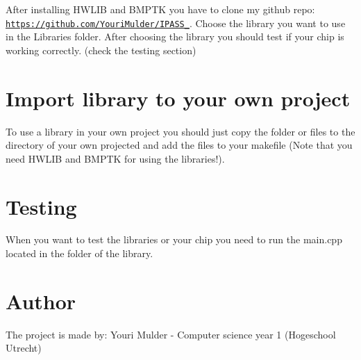After installing H\+W\+L\+IB and B\+M\+P\+TK you have to clone my github repo\+: \href{https://github.com/YouriMulder/IPASS_2018}{\tt https\+://github.\+com/\+Youri\+Mulder/\+I\+P\+A\+S\+S\+\_}. Choose the library you want to use in the Libraries folder. After choosing the library you should test if your chip is working correctly. (check the testing section)\hypertarget{index_import_sec}{}\section{Import library to your own project}\label{index_import_sec}
To use a library in your own project you should just copy the folder or files to the directory of your own projected and add the files to your makefile (Note that you need H\+W\+L\+IB and B\+M\+P\+TK for using the libraries!).\hypertarget{index_test_sec}{}\section{Testing}\label{index_test_sec}
When you want to test the libraries or your chip you need to run the main.\+cpp located in the folder of the library.\hypertarget{index_author_sec}{}\section{Author}\label{index_author_sec}
The project is made by\+: Youri Mulder -\/ Computer science year 1 (Hogeschool Utrecht) 